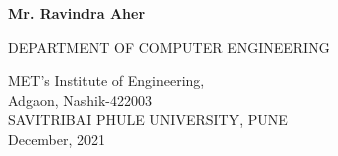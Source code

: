 \documentclass[openany,12pt]{report}
\begin{document}
\begin{titlepage}
\begin{center}
			\vspace{0.1in}
			
			{\bf Mr. Ravindra Aher}\\
			\vspace{0.4in}
			
			
			{\small DEPARTMENT OF COMPUTER ENGINEERING}\\
			\begin{figure}[h]
				\centerline{}
				\label{atcres}
			\end{figure}
			{\large MET's Institute of Engineering,}\\
			{\small Adgaon, Nashik-422003}\\
			SAVITRIBAI PHULE UNIVERSITY, PUNE\\
			\vspace{0.2in}
			{\small December, 2021}
		\end{center}
	\end{titlepage}
	
\end{document}
